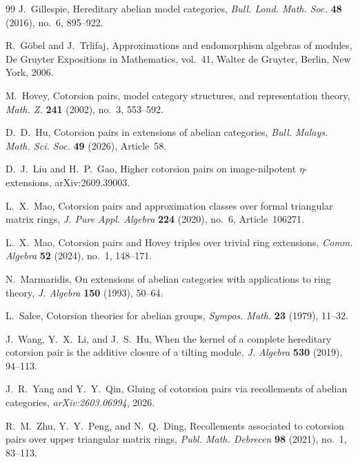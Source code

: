 \documentclass[11pt,reqno]{amsart}
\numberwithin{equation}{section}
\begin{document}
\begin{thebibliography}{99}
J.~Gillespie,
Hereditary abelian model categories,
\emph{Bull. Lond. Math. Soc.} \textbf{48} (2016), no.~6, 895--922.

R.~G\"obel and J.~Trlifaj,
{Approximations and endomorphism algebras of modules},
De Gruyter Expositions in Mathematics, vol.~41,
Walter de Gruyter, Berlin, New York, 2006.

M.~Hovey,
Cotorsion pairs, model category structures, and representation theory,
\emph{Math. Z.} \textbf{241} (2002), no.~3, 553--592.

D.~D.~Hu,
Cotorsion pairs in extensions of abelian categories,
\emph{Bull. Malays. Math. Sci. Soc.} \textbf{49} (2026), Article~58.

D.~J.~Liu and H.~P.~Gao, Higher cotorsion pairs on image-nilpotent
$\eta$-extensions, arXiv:2609.39003.

L.~X.~Mao,
Cotorsion pairs and approximation classes over formal triangular matrix rings,
\emph{J. Pure Appl. Algebra} \textbf{224} (2020), no.~6, Article~106271.

L.~X.~Mao,
Cotorsion pairs and Hovey triples over trivial ring extensions,
\emph{Comm. Algebra} \textbf{52} (2024), no.~1, 148--171.

N.~Marmaridis,
On extensions of abelian categories with applications to ring theory,
\emph{J. Algebra} \textbf{150} (1993), 50--64.

L.~Salce,
Cotorsion theories for abelian groups,
\emph{Sympos. Math.} \textbf{23} (1979), 11--32.

J.~Wang, Y.~X.~Li, and J.~S.~Hu,
When the kernel of a complete hereditary cotorsion pair is the additive closure of a tilting module,
\emph{J. Algebra} \textbf{530} (2019), 94--113.

J.~R.~Yang and Y.~Y.~Qin,
Gluing of cotorsion pairs via recollements of abelian categories,
\emph{arXiv:2603.06994}, 2026.

R.~M.~Zhu, Y.~Y.~Peng, and N.~Q.~Ding,
Recollements associated to cotorsion pairs over upper triangular matrix rings,
\emph{Publ. Math. Debrecen} \textbf{98} (2021), no.~1, 83--113.

\end{thebibliography}
\end{document}
